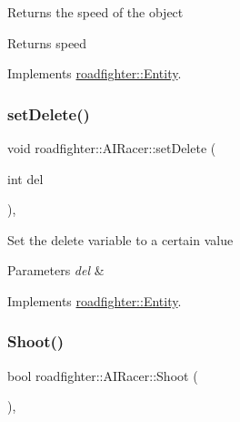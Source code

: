 Returns the speed of the object \begin{DoxyReturn}{Returns}
speed 
\end{DoxyReturn}


Implements \hyperlink{classroadfighter_1_1Entity_ad3760184d764a61922e1db7d98501ee4}{roadfighter\+::\+Entity}.

\mbox{\label{classroadfighter_1_1AIRacer_a10823d4a02dbdad6d760020f8cee7afe}} 
\subsubsection{\texorpdfstring{set\+Delete()}{setDelete()}}
{\footnotesize\ttfamily void roadfighter\+::\+A\+I\+Racer\+::set\+Delete (\begin{DoxyParamCaption}\item[{int}]{del }\end{DoxyParamCaption})\hspace{0.3cm}{\ttfamily [override]}, {\ttfamily [virtual]}}

Set the delete variable to a certain value 
\begin{DoxyParams}{Parameters}
{\em del} & \\
\hline
\end{DoxyParams}


Implements \hyperlink{classroadfighter_1_1Entity_a07e973f0fa941a69e749629716877692}{roadfighter\+::\+Entity}.

\mbox{\label{classroadfighter_1_1AIRacer_a9e1ce152093bd4f7deb676c443a7851a}} 
\subsubsection{\texorpdfstring{Shoot()}{Shoot()}}
{\footnotesize\ttfamily bool roadfighter\+::\+A\+I\+Racer\+::\+Shoot (\begin{DoxyParamCaption}{ }\end{DoxyParamCaption})\hspace{0.3cm}{\ttfamily [override]}, {\ttfamily [virtual]}}

